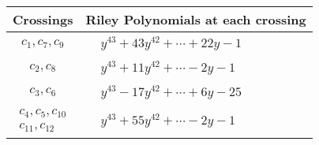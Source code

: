 \documentclass[1p]{elsarticle_modified}
\theoremstyle{definition}
\begin{document}
\begin{tabular}{m{50pt}|m{274pt}}
Crossings & \hspace{64pt}Riley Polynomials at each crossing \\
\hline $$\begin{aligned}c_{1},c_{7},c_{9}\end{aligned}$$&$\begin{aligned}
&y^{43}+43 y^{42}+\cdots+22 y-1
\end{aligned}$\\
\hline $$\begin{aligned}c_{2},c_{8}\end{aligned}$$&$\begin{aligned}
&y^{43}+11 y^{42}+\cdots-2 y-1
\end{aligned}$\\
\hline $$\begin{aligned}c_{3},c_{6}\end{aligned}$$&$\begin{aligned}
&y^{43}-17 y^{42}+\cdots+6 y-25
\end{aligned}$\\
\hline $$\begin{aligned}c_{4},c_{5},c_{10}\\c_{11},c_{12}\end{aligned}$$&$\begin{aligned}
&y^{43}+55 y^{42}+\cdots-2 y-1
\end{aligned}$\\
\hline
\end{tabular}
\vskip 2pc
\end{document}
